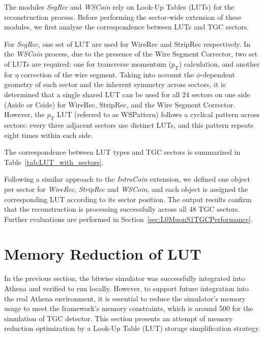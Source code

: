 The modules \textit{SegRec} and \textit{WSCoin} rely on Look-Up Tables (LUTs) for the reconstruction process. Before performing the sector-wide extension of these modules, we first analyze the correspondence between LUTs and TGC sectors.

For \textit{SegRec}, one set of LUT are used for WireRec and StripRec respectively. In the \textit{WSCoin} process, due to the presence of the Wire Segment Corrector, two set of LUTs are required: one for transverse momentum ($p_\mathrm{T}$) calculation, and another for $\eta$ correction of the wire segment. Taking into account the $\phi$-dependent geometry of each sector and the inherent symmetry across sectors, it is determined that a single shared LUT can be used for all 24 sectors on one side (Aside or Cside) for WireRec, StripRec, and the Wire Segment Corrector. However, the $p_\mathrm{T}$ LUT (referred to as WSPattern) follows a cyclical pattern across sectors: every three adjacent sectors use distinct LUTs, and this pattern repeats eight times within each side.

The correspondence between LUT types and TGC sectors is summarized in Table~\ref{tab:LUT_with_sectors}.


Following a similar approach to the \textit{IntraCoin} extension, we defined one object per sector for \textit{WireRec}, \textit{StripRec} and \textit{WSCoin}, and each object is assigned the corresponding LUT according to its sector position. The output results confirm that the reconstruction is processing successfully across all 48 TGC sectors. Further evaluations are performed in Section~\ref{sec:L0MuonS1TGCPerformance}.
\section{Memory Reduction of LUT} \label{sec:MemoryReduction}
In the previous section, the bitwise simulator was successfully integrated into Athena and verified to run locally. However, to support future integration into the real Athena environment, it is essential to reduce the simulator's memory usage to meet the framework’s memory constraints, which is around 500  for the simulation of TGC detector. This section presents an attempt of memory reduction optimization by a Look-Up Table (LUT) storage simplification strategy.

